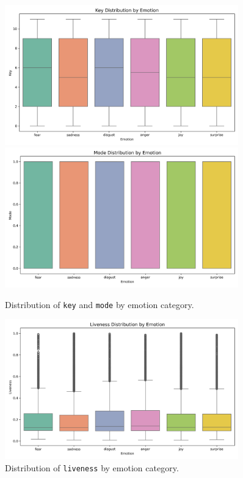 \documentclass{article}
\begin{document}
\begin{figure}[H]
\centering
\includegraphics[width=0.9\textwidth]{Graphics/feature_by_emotion/key_by_emotion_boxplot.png}
\includegraphics[width=0.9\textwidth]{Graphics/feature_by_emotion/mode_by_emotion_boxplot.png}
\caption{Distribution of \texttt{key} and \texttt{mode} by emotion category.}
\end{figure}

\begin{figure}[H]
\centering
\includegraphics[width=0.9\textwidth]{Graphics/feature_by_emotion/liveness_by_emotion_boxplot.png}
\caption{Distribution of \texttt{liveness} by emotion category.}
\end{figure}
\end{document}
